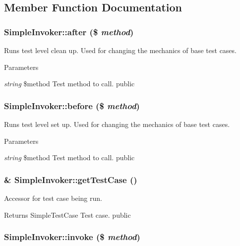 \subsection{Member Function Documentation}
\hypertarget{class_simple_invoker_a65e6a4f996ecc4ae9d015a528b5188c3}{
\subsubsection[{after}]{\setlength{\rightskip}{0pt plus 5cm}SimpleInvoker::after (\$ {\em method})}}
\label{class_simple_invoker_a65e6a4f996ecc4ae9d015a528b5188c3}
Runs test level clean up. Used for changing the mechanics of base test cases. 
\begin{DoxyParams}{Parameters}
\item[{\em string}]\$method Test method to call.  public \end{DoxyParams}
\hypertarget{class_simple_invoker_acf9fb37462a5c7b73fd5a7ebbe6974dd}{
\subsubsection[{before}]{\setlength{\rightskip}{0pt plus 5cm}SimpleInvoker::before (\$ {\em method})}}
\label{class_simple_invoker_acf9fb37462a5c7b73fd5a7ebbe6974dd}
Runs test level set up. Used for changing the mechanics of base test cases. 
\begin{DoxyParams}{Parameters}
\item[{\em string}]\$method Test method to call.  public \end{DoxyParams}
\hypertarget{class_simple_invoker_a7f50cb5c6078448f33da8cbfa9c04b4a}{
\subsubsection[{getTestCase}]{\setlength{\rightskip}{0pt plus 5cm}\& SimpleInvoker::getTestCase ()}}
\label{class_simple_invoker_a7f50cb5c6078448f33da8cbfa9c04b4a}
Accessor for test case being run. \begin{DoxyReturn}{Returns}
SimpleTestCase Test case.  public 
\end{DoxyReturn}
\hypertarget{class_simple_invoker_a9e26c2b57c77dd61f8eb26760aab0c32}{
\subsubsection[{invoke}]{\setlength{\rightskip}{0pt plus 5cm}SimpleInvoker::invoke (\$ {\em method})}}
